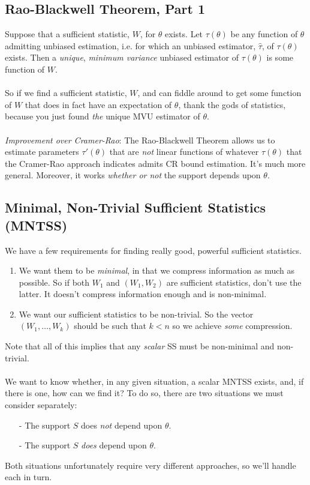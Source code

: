 \documentclass[a4paper,12pt]{scrartcl}
\begin{document}
\subsection{Rao-Blackwell Theorem, Part 1}

Suppose that a sufficient statistic, $W$, for $\theta$ exists.  Let
$\tau(\theta)$ be any function of $\theta$ admitting unbiased
estimation, i.e. for which an unbiased estimator, $\hat{\tau}$, of
$\tau(\theta)$ exists. Then a \emph{unique}, \emph{minimum variance}
unbiased estimator of $\tau(\theta)$ is some function of $W$. 
\\
\\
So if we find a sufficient statistic, $W$, and can fiddle around to get 
some function of $W$ that does in fact have an expectation of $\theta$,
thank the gods of statistics, because you just found \emph{the}
unique MVU estimator of $\theta$.
\\
\\
{\sl Improvement over Cramer-Rao}: The Rao-Blackwell Theorem 
allows us to estimate parameters $\tau'(\theta)$ that are \emph{not}
linear functions of whatever $\tau(\theta)$ that the Cramer-Rao approach
indicates admits CR bound estimation. It's much
more general. Moreover, it works \emph{whether or not} the support
depends upon $\theta$.


\subsection{Minimal, Non-Trivial Sufficient Statistics (MNTSS)}

We have a few requirements for finding really good, powerful 
sufficient statistics.
\begin{enumerate}
   \item We want them to be \emph{minimal}, in that we compress 
      information as
      much as possible. So if both $W_1$ and $(W_1, W_2)$ are sufficient
      statistics, don't use the latter. It doesn't compress information
      enough and is non-minimal.
   \item We want our sufficient statistics to be non-trivial. So 
      the vector $(W_1, \ldots, W_k)$ should be such that 
      $k < n$ so we achieve \emph{some} compression.
\end{enumerate}
Note that all of this implies that any \emph{scalar} SS must be 
non-minimal and non-trivial. 
\\
\\
We want to know whether, in any given situation, a scalar MNTSS
exists, and, if there is one, how can we find it? To do so, there
are two situations we must consider separately:
\begin{itemize}
   \item[-] The support $S$ does \emph{not} depend upon $\theta$.
   \item[-] The support $S$ \emph{does} depend upon $\theta$.
\end{itemize}
Both situations unfortunately require very different approaches, so
we'll handle each in turn.
\end{document}
